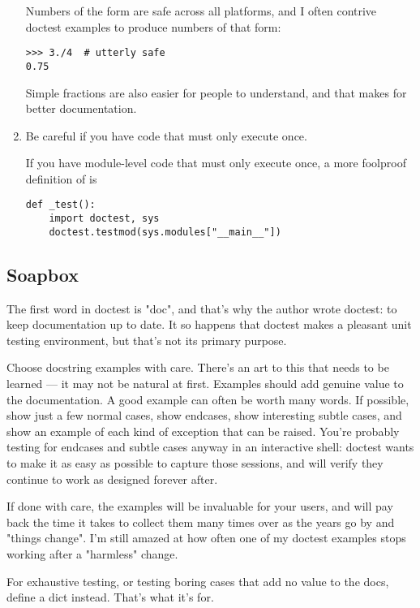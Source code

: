 \begin{enumerate}
Numbers of the form  are safe across all platforms, and I
often contrive doctest examples to produce numbers of that form:

\begin{verbatim}
>>> 3./4  # utterly safe
0.75
\end{verbatim}

Simple fractions are also easier for people to understand, and that makes
for better documentation.

\item Be careful if you have code that must only execute once.

If you have module-level code that must only execute once, a more foolproof
definition of  is

\begin{verbatim}
def _test():
    import doctest, sys
    doctest.testmod(sys.modules["__main__"])
\end{verbatim}
\end{enumerate}


\subsection{Soapbox}

The first word in doctest is "doc", and that's why the author wrote
doctest:  to keep documentation up to date.  It so happens that doctest
makes a pleasant unit testing environment, but that's not its primary
purpose.

Choose docstring examples with care.  There's an art to this that needs to
be learned --- it may not be natural at first.  Examples should add genuine
value to the documentation.  A good example can often be worth many words.
If possible, show just a few normal cases, show endcases, show interesting
subtle cases, and show an example of each kind of exception that can be
raised.  You're probably testing for endcases and subtle cases anyway in an
interactive shell:  doctest wants to make it as easy as possible to capture
those sessions, and will verify they continue to work as designed forever
after.

If done with care, the examples will be invaluable for your users, and will
pay back the time it takes to collect them many times over as the years go
by and "things change".  I'm still amazed at how often one of my doctest
examples stops working after a "harmless" change.

For exhaustive testing, or testing boring cases that add no value to the
docs, define a  dict instead.  That's what it's for.

